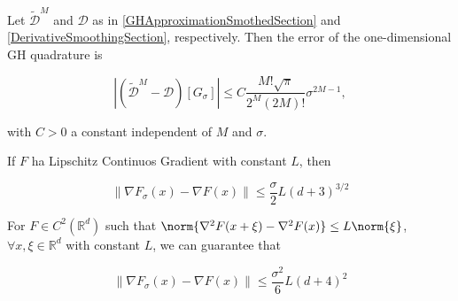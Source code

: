 \begin{thm}\label{GHError}

Let $\widetilde{\mathcal{D}}^{M}$ and $\mathcal{D}$ as in \ref{GHApproximationSmothedSection} and \ref{DerivativeSmoothingSection}, respectively. Then the error of the one-dimensional GH quadrature is

\begin{equation}\label{BoundErrorGHEq}
\left|\left(\widetilde{\mathcal{D}}^{M}-\mathcal{D}\right)\left[G_{\sigma}\right]\right| \leq C \frac{M ! \sqrt{\pi}}{2^{M}(2 M) !} \sigma^{2 M-1},   
\end{equation}

with $C>0$ a constant independent of $M$ and $\sigma$.

\end{thm}

\begin{prop}\label{PrimoLemmaNesterov}
If $ F $ ha Lipschitz Continuos Gradient with constant $ L $, then

\begin{equation}
\left\|\nabla F_{\sigma}(x)-\nabla F(x)\right\| \leq \frac{\sigma}{2} L(d+3)^{3 / 2}
\end{equation}

For $ F \in C^{2}(\mathbb{R}^d) $ such that $\norm{\nabla^2 F(x+\xi) - \nabla^2 F(x)} \leq L \norm{\xi}$, $\forall x, \xi \in \mathbb{R}^d$ with constant $ L $, we can guarantee that

\begin{equation}
\left\|\nabla F_{\sigma}(x)-\nabla F(x)\right\| \leq \frac{\sigma^{2}}{6} L(d+4)^{2}
\end{equation}

\end{prop}

